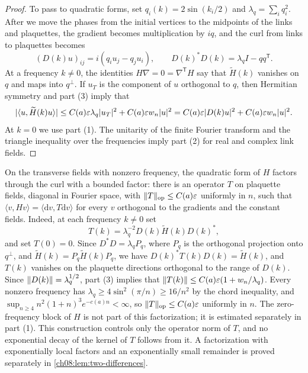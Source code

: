 \begin{proof}
To pass to quadratic forms, set $q_i(k)=2\sin(k_i/2)$ and $\lambda_q=\sum_iq_i^2$. After we move the phases from the initial vertices to the midpoints of the links and plaquettes, the gradient becomes multiplication by $iq$, and the curl from links to plaquettes becomes
\[
 (D(k)u)_{ij}=i(q_iu_j-q_ju_i),\qquad D(k)^*D(k)=\lambda_qI-qq^{\mathsf T}.
\]
At a frequency $k\ne0$, the identities $H\nabla=0=\nabla^{\mathsf T}H$ say that $\widetilde H(k)$ vanishes on $q$ and maps into $q^\perp$. If $u_T$ is the component of $u$ orthogonal to $q$, then Hermitian symmetry and part (3) imply that
\[
 \lvert \langle u,\widetilde H(k)u\rangle\rvert\le C(a)\varepsilon\lambda_q\lvert u_T\rvert^2+C(a)\varepsilon w_n\lvert u\rvert^2=C(a)\varepsilon\lvert D(k)u\rvert^2+C(a)\varepsilon w_n\lvert u\rvert^2.
\]
At $k=0$ we use part (1). The unitarity of the finite Fourier transform and the triangle inequality over the frequencies imply part (2) for real and complex link fields.
\end{proof}

\begin{remark}\label{ch05:rem:curl-factor}
On the transverse fields with nonzero frequency, the quadratic form of $H$ factors through the curl with a bounded factor: there is an operator $T$ on plaquette fields, diagonal in Fourier space, with $\lVert T\rVert_{\mathrm{op}}\le C(a)\varepsilon$ uniformly in $n$, such that $\langle v,Hv\rangle=\langle\mathrm dv,T\mathrm dv\rangle$ for every $v$ orthogonal to the gradients and the constant fields. Indeed, at each frequency $k\ne0$ set
\[
 T(k)=\lambda_q^{-2}D(k)\widetilde H(k)D(k)^*,
\]
and set $T(0)=0$. Since $D^*D=\lambda_qP_q$, where $P_q$ is the orthogonal projection onto $q^\perp$, and $\widetilde H(k)=P_q\widetilde H(k)P_q$, we have $D(k)^*T(k)D(k)=\widetilde H(k)$, and $T(k)$ vanishes on the plaquette directions orthogonal to the range of $D(k)$. Since $\lVert D(k)\rVert=\lambda_q^{1/2}$, part (3) implies that $\lVert T(k)\rVert\le C(a)\varepsilon(1+w_n/\lambda_q)$. Every nonzero frequency has $\lambda_q\ge4\sin^2(\pi/n)\ge16/n^2$ by the chord inequality, and $\sup_{n\ge4}n^2(1+n)^3e^{-c(a)n}<\infty$, so $\lVert T\rVert_{\mathrm{op}}\le C(a)\varepsilon$ uniformly in $n$. The zero-frequency block of $H$ is not part of this factorization; it is estimated separately in part (1). This construction controls only the operator norm of $T$, and no exponential decay of the kernel of $T$ follows from it. A factorization with exponentially local factors and an exponentially small remainder is proved separately in \cref{ch08:lem:two-differences}.
\end{remark}

